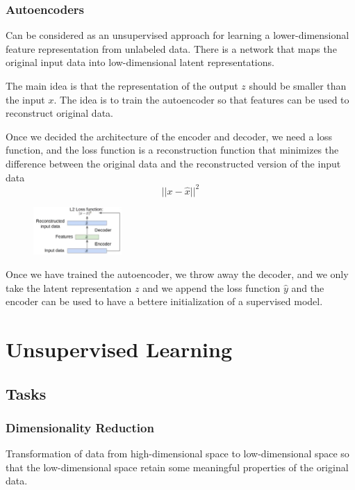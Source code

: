 \documentclass[a4paper,6pt,twocolumn,fleqn]{article}
\begin{document}
\subsubsection{Autoencoders} %
Can be considered as an unsupervised approach for learning a lower-dimensional feature representation from unlabeled data. There is a network that maps the original input data into low-dimensional latent representations.

The main idea is that the representation of the output \(z\) should be smaller than the input \(x\). The idea is to train the autoencoder so that features can be used to reconstruct original data.

Once we decided the architecture of the encoder and decoder, we need a loss function, and the loss function is a reconstruction function that minimizes the difference between the original data and the reconstructed version of the input data
\begin{equation}
    ||x - \hat x||^2
\end{equation}
\begin{figure}[h]
    \vspace{-10pt}
	\begin{center}
		\includegraphics[width=0.30\textwidth]{063}
	\end{center}
    \vspace{-20pt}
\end{figure}
Once we have trained the autoencoder, we throw away the decoder, and we only take the latent representation \(z\) and we append the loss function \(\hat y\) and the encoder can be used to have a bettere initialization of a supervised model.

\section{Unsupervised Learning}
\subsection{Tasks} %
\subsubsection{Dimensionality Reduction} %
Transformation of data from high-dimensional space to low-dimensional space so that the low-dimensional space retain some meaningful properties of the original data.
\end{document}
